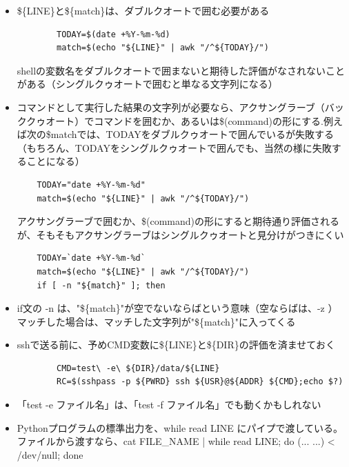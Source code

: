 \documentclass[12pt,a4paper,uplatex]{jsarticle}
\begin{document}
\begin{itemize}
	\item \$\{LINE\}と\$\{match\}は、ダブルクオートで囲む必要がある	
	\begin{verbatim}
		TODAY=$(date +%Y-%m-%d)
		match=$(echo "${LINE}" | awk "/^${TODAY}/")
	\end{verbatim}
	shellの変数名をダブルクオートで囲まないと期待した評価がなされないことがある（シングルクゥオートで囲むと単なる文字列になる）
	\item コマンドとして実行した結果の文字列が必要なら、アクサングラーブ（バッククゥオート）でコマンドを囲むか、あるいは\$(command)の形にする.例えば次の\${match}では、TODAYをダブルクゥオートで囲んでいるが失敗する（もちろん、TODAYをシングルクゥオートで囲んでも、当然の様に失敗することになる）
	\begin{verbatim}
	TODAY="date +%Y-%m-%d"
	match=$(echo "${LINE}" | awk "/^${TODAY}/")
	\end{verbatim}
	アクサングラーブで囲むか、\$(command)の形にすると期待通り評価されるが、そもそもアクサングラーブはシングルクゥオートと見分けがつきにくい
	\begin{verbatim}
	TODAY=`date +%Y-%m-%d`
	match=$(echo "${LINE}" | awk "/^${TODAY}/")
	if [ -n "${match}" ]; then
	\end{verbatim}
	\item if文の -n は、"\$\{match\}"が空でないならばという意味（空ならばは、-z ）\\マッチした場合は、マッチした文字列が"\$\{match\}"に入ってくる
	\item sshで送る前に、予めCMD変数に\$\{LINE\}と\$\{DIR\}の評価を済ませておく
	\begin{verbatim}
		CMD=test\ -e\ ${DIR}/data/${LINE}
		RC=$(sshpass -p ${PWRD} ssh ${USR}@${ADDR} ${CMD};echo $?)
	\end{verbatim}
	\item 「test -e ファイル名」は、「test -f ファイル名」でも動くかもしれない
	\item Pythonプログラムの標準出力を、while read LINE にパイプで渡している。ファイルから渡すなら、cat FILE\_NAME | while read LINE; do (... ...) < /dev/null; done
\end{itemize}
\end{document}

